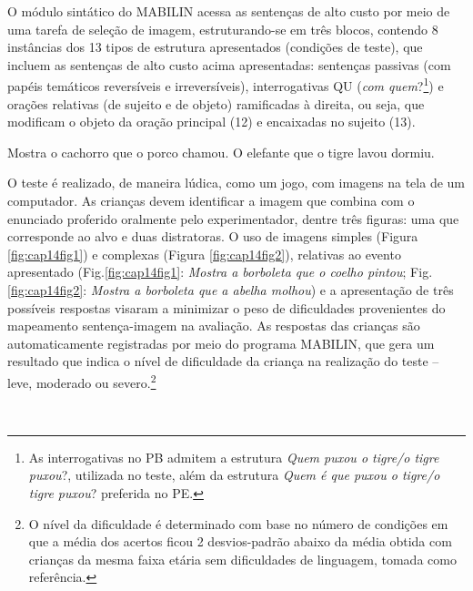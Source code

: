\documentclass[output=paper,colorlinks,citecolor=brown,booklanguage=portuguese]{langscibook}
\begin{document}
O módulo sintático do MABILIN acessa as sentenças de alto custo por meio de uma tarefa de seleção de imagem, estruturando-se em três blocos, contendo 8 instâncias dos 13 tipos de estrutura apresentados (condições de teste), que incluem as sentenças de alto custo acima apresentadas: sentenças passivas (com papéis temáticos reversíveis e irreversíveis), interrogativas QU (\emph{com quem}?\footnote{As interrogativas no PB admitem a estrutura \emph{Quem puxou o tigre/o tigre puxou}?, utilizada no teste, além da estrutura \emph{Quem é que puxou o tigre/o tigre puxou}? preferida no PE.}) e orações relativas (de sujeito e de objeto) ramificadas à direita, ou seja, que modificam o objeto da oração principal (12) e encaixadas no sujeito (13).


\ea\label{ex:14:12} 	Mostra o cachorro que o porco chamou.
\z
\ea\label{ex:14:13} 	O elefante que o tigre lavou dormiu.
\z

O teste é realizado, de maneira lúdica, como um jogo, com imagens na tela de um computador. As crianças devem identificar a imagem que combina com o enunciado proferido oralmente pelo experimentador, dentre três figuras: uma que corresponde ao alvo e duas distratoras. O uso de imagens simples (Figura \ref{fig:cap14fig1}) e complexas (Figura \ref{fig:cap14fig2}), relativas ao evento apresentado (Fig.\ref{fig:cap14fig1}: \emph{Mostra a borboleta que o coelho pintou}; Fig.\ref{fig:cap14fig2}: \emph{Mostra a borboleta que a abelha molhou}) e a apresentação de três possíveis respostas visaram a minimizar o peso de dificuldades provenientes do mapeamento sentença-imagem na avaliação. As respostas das crianças são automaticamente registradas por meio do programa MABILIN, que gera um resultado que indica o nível de dificuldade da criança na realização do teste – leve, moderado ou severo.\footnote{O nível da dificuldade é determinado com base no número de condições em que a média dos acertos ficou 2 desvios-padrão abaixo da média obtida com crianças da mesma faixa etária sem dificuldades de linguagem, tomada como referência.}



\begin{figure}
%
  \caption{~}
\end{figure}
\end{document}
